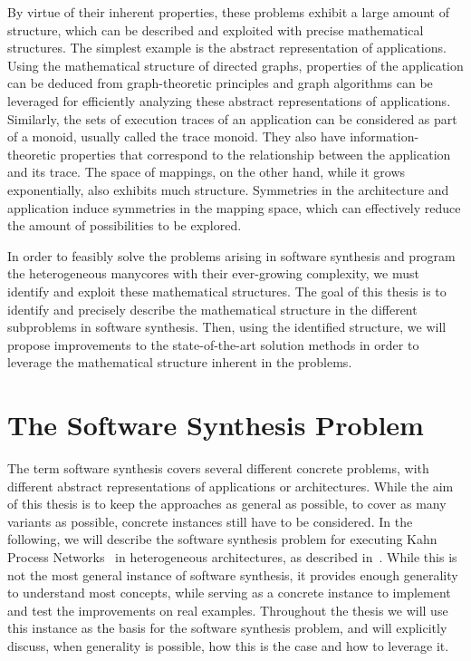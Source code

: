 \documentclass{article}
\begin{document}
By virtue of their inherent properties, these problems exhibit a large amount of structure, which can be described and exploited with precise mathematical structures.
The simplest example is the abstract representation of applications.
Using the mathematical structure of directed graphs, properties of the application can be deduced from graph-theoretic principles and graph algorithms can be leveraged for efficiently analyzing these abstract representations of applications.
Similarly, the sets of execution traces of an application can be considered as part of a monoid, usually called the trace monoid. They also have information-theoretic properties that correspond to the relationship between the application and its trace.
The space of mappings, on the other hand, while it grows exponentially, also exhibits much structure. Symmetries in the architecture and application induce symmetries in the mapping space, which can effectively reduce the amount of possibilities to be explored.

In order to feasibly solve the problems arising in software synthesis and program the heterogeneous manycores with their ever-growing complexity, we must identify and exploit these mathematical structures. The goal of this thesis is to identify and precisely describe 
the mathematical structure in the different subproblems in software synthesis. Then, using the identified structure, we will propose improvements to the state-of-the-art solution methods in order to leverage the mathematical structure inherent in the problems.


\section{The Software Synthesis Problem}

The term software synthesis covers several different concrete problems, with different abstract representations of applications or architectures.
While the aim of this thesis is to keep the approaches as general as possible, to cover as many variants as possible, concrete instances still have to be considered.
In the following, we will describe the software synthesis problem for executing Kahn Process Networks~\cite{kahn74} in heterogeneous architectures, as described in~\cite{castrillon_springer}.
While this is not the most general instance of software synthesis, it provides enough generality to understand most concepts, while serving as a concrete instance to implement and test the improvements on real examples.
Throughout the thesis we will use this instance as the basis for the software synthesis problem, and will explicitly discuss, when generality is possible, how this is the case and how to leverage it.
\end{document}
